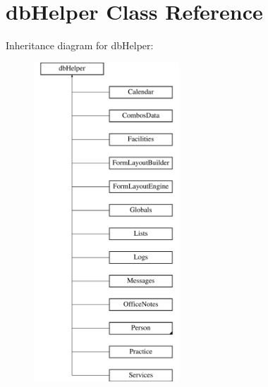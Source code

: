 \hypertarget{classdb_helper}{\section{db\-Helper \-Class \-Reference}
\label{classdb_helper}
}
\-Inheritance diagram for db\-Helper\-:\begin{figure}[H]
\begin{center}
\leavevmode
\includegraphics[height=12.000000cm]{classdb_helper}
\end{center}
\end{figure}

